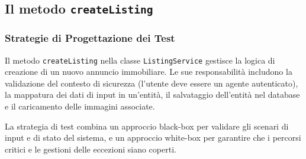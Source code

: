 \subsection{Il metodo \texttt{createListing}}
\subsubsection{Strategie di Progettazione dei Test}
Il metodo \texttt{createListing} nella classe \texttt{ListingService} gestisce la logica di creazione di un nuovo annuncio immobiliare. Le sue responsabilità includono la validazione del contesto di sicurezza (l'utente deve essere un agente autenticato), la mappatura dei dati di input in un'entità, il salvataggio dell'entità nel database e il caricamento delle immagini associate.

La strategia di test combina un approccio black-box per validare gli scenari di input e di stato del sistema, e un approccio white-box per garantire che i percorsi critici e le gestioni delle eccezioni siano coperti.


